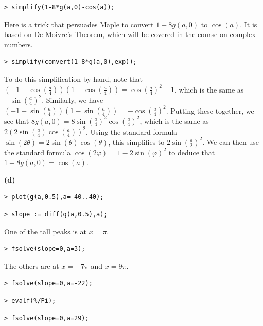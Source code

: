 \documentclass{article}
\begin{document}
\begin{lstlisting}
> simplify(1-8*g(a,0)-cos(a));
\end{lstlisting}
\begin{Maple Normal}
Here is a trick that persuades Maple to convert 
$1-8 g (a ,0)$ to 
$\cos (a)$.  It is based on De Moivre's Theorem, which will be covered in the course on complex numbers.
\end{Maple Normal}
\begin{lstlisting}
> simplify(convert(1-8*g(a,0),exp));
\end{lstlisting}
\begin{Maple Normal}
To do this simplification by hand, note that 
$(-1-\cos (\frac{a}{4}))(1-\cos (\frac{a}{4}))=\cos (\frac{a}{4})^{2}-1$, which is the same as 
$-\sin (\frac{a}{4})^{2}$.  Similarly, we have 
$(-1-\sin (\frac{a}{4})) (1-\sin (\frac{a}{4}))=-\cos (\frac{a}{4})^{2}$.  Putting these together, we see that 
$8 g (a ,0)=8 \sin (\frac{a}{4})^{2} \cos (\frac{a}{4})^{2}$, which is the same as 
$2 (2 \sin (\frac{a}{4}) \cos (\frac{a}{4}))^{2}$.  Using the standard formula 
$\sin (2 \theta)=2 \sin (\theta) \cos (\theta)$, this simplifies to 
$2 \sin (\frac{a}{2})^{2}$.  We can then use the standard formula 
$\cos (2 \varphi)=1-2 \sin (\varphi)^{2}$ to deduce that 
$1-8 g (a ,0)=\cos (a)$. 
\end{Maple Normal}
\begin{Maple Heading 2}
\textbf{(d)}
\end{Maple Heading 2}
\begin{lstlisting}
> plot(g(a,0.5),a=-40..40);
\end{lstlisting}
\begin{lstlisting}
> slope := diff(g(a,0.5),a);
\end{lstlisting}
\begin{Maple Normal}
One of the tall peaks is at 
$x =\pi$.
\end{Maple Normal}
\begin{lstlisting}
> fsolve(slope=0,a=3);
\end{lstlisting}
\begin{Maple Normal}
The others are at 
$x =-7 \pi$ and 
$x =9 \pi$. 
\end{Maple Normal}
\begin{lstlisting}
> fsolve(slope=0,a=-22);
\end{lstlisting}
\begin{lstlisting}
> evalf(%/Pi);
\end{lstlisting}
\begin{lstlisting}
> fsolve(slope=0,a=29);
\end{lstlisting}
\end{document}
